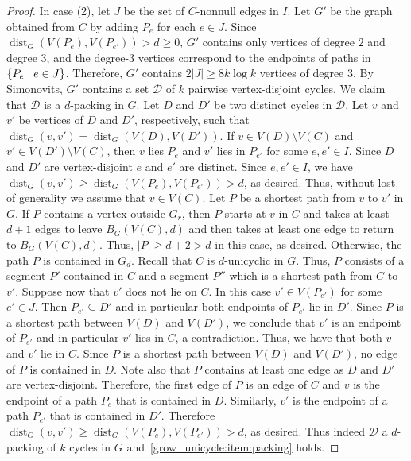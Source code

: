 \documentclass{patmorin}
\DeclareMathOperator{\dist}{dist}
\DeclarePairedDelimiter\set{\{}{\}}
\begin{document}
\begin{proof}
  In case (2), let $J$ be the set of $C$-nonnull edges in $I$. 
  Let $G'$ be the graph obtained from $C$ by adding $P_e$ for each $e\in J$. 
  Since $\dist_G(V(P_e),V(P_{e'}))>d\ge0$, $G'$ contains only vertices of degree $2$ and degree $3$, and the degree-$3$ vertices correspond to the endpoints of paths in $\set{P_e \mid e\in J}$.
  Therefore, $G'$ contains $2|J|\geq 8k\log k$ vertices of degree $3$. 
  By Simonovits, $G'$ contains a set $\mathcal{D}$ of $k$ pairwise vertex-disjoint cycles. 
  We claim that $\mathcal{D}$ is a $d$-packing in $G$. 
  Let $D$ and $D'$ be two distinct cycles in $\mathcal{D}$. 
  Let $v$ and $v'$ be vertices of $D$ and $D'$, respectively, 
  such that $\dist_G(v,v')=\dist_G(V(D),V(D'))$. 
  If $v\in V(D)\setminus V(C)$ and $v'\in V(D')\setminus V(C)$, then 
  $v$ lies $P_e$ and $v'$ lies in $P_{e'}$ for some  $e,e' \in I$. 
  Since $D$ and $D'$ are vertex-disjoint $e$ and $e'$ are distinct. 
  Since $e,e'\in I$, we have $\dist_G(v,v') \geq \dist_G(V(P_e),V(P_{e'}))>d$, as desired. 
  Thus, without lost of generality we assume that $v \in V(C)$. 
  Let $P$ be a shortest path from $v$ to $v'$ in $G$. 
  If $P$ contains a vertex outside $G_r$, then 
  $P$ starts at $v$ in $C$ and takes at least $d+1$ edges to leave $B_G(V(C),d)$ and then takes at least one edge to return to $B_G(V(C),d)$. 
  Thus, $|P|\geq d+2 > d$ in this case, as desired.
  Otherwise, the path $P$ is contained in $G_d$. 
  Recall that $C$ is $d$-unicyclic in $G$. 
  Thus, $P$ consists of a segment $P'$ contained in $C$ and a segment $P''$ which is a shortest path from $C$ to $v'$. 
  Suppose now that $v'$ does not lie on $C$. 
  In this case $v' \in V(P_{e'})$ for some $e'\in J$. 
  Then $P_{e'}\subseteq D'$ and in particular both endpoints of $P_{e'}$ lie in $D'$. 
  Since $P$ is a shortest path between $V(D)$ and $V(D')$, 
  we conclude that $v'$ is an endpoint of $P_{e'}$ and in particular $v'$ lies in $C$, a contradiction.
  Thus, we have that both $v$ and $v'$ lie in $C$.
  Since $P$ is a shortest path between $V(D)$ and $V(D')$, no edge of $P$ is contained in $D$. Note also that $P$ contains at least one edge as $D$ and $D'$ are vertex-disjoint. Therefore, the first edge of $P$ is an edge of $C$ and $v$ is the endpoint of a path $P_e$ that is contained in $D$. Similarly, $v'$ is the endpoint of a path $P_{e'}$ that is contained in $D'$. Therefore $\dist_G(v,v')\ge \dist_G(V(P_e),V(P_{e'}))>d$, as desired.
  Thus indeed $\mathcal{D}$ a $d$-packing of  $k$ cycles in $G$ and~\eqref{grow_unicycle:item:packing} holds.
  

\end{proof}
\end{document}
